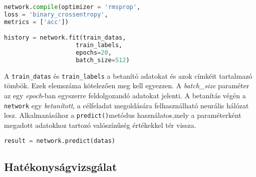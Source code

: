 \begin{minipage}{\linewidth}
\begin{lstlisting}[language=Python,caption=Hálózat betanítása]
network.compile(optimizer = 'rmsprop',
loss = 'binary_crossentropy',
metrics = ['acc'])

history = network.fit(train_datas,
					train_labels,
					epochs=20,
					batch_size=512)
\end{lstlisting}\label{lst:fitNetwork}
\end{minipage}

A \verb|train_datas| és \verb|train_labels| a betanító adatokat és azok címkéit tartalmazó tömbök. Ezek elemszáma kötelezően meg kell egyezzen. A \emph{batch\_size} paraméter az egy \emph{epoch}-ban egyszerre feldolgozandó adatokat jelenti. A betanítás végén a \verb|network| egy \emph{betanított}, a célfeladat megoldására felhasználható neurális hálózat lesz. Alkalmazásához a \verb|predict()|metódus használatos,mely a paraméterként megadott adatokhoz tartozó valószínűség értékekkel tér vissza.
\begin{minipage}{\linewidth}
\begin{lstlisting}[language=Python, caption=Következtetés]
	result = network.predict(datas)
\end{lstlisting}
\end{minipage}

\subsection{Hatékonyságvizsgálat}


